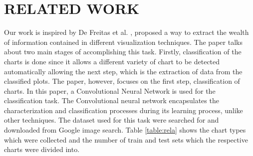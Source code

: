 \documentclass[12pt, a4paper,oneside]{report}
\begin{document}
\chapter{RELATED WORK}
Our work is inspired by De Freitas et al. \cite{junior2017architecture}, proposed a way to extract the wealth of information contained in different visualization techniques. The paper talks about two main stages of accomplishing this task. Firstly, classification of the charts is done since it allows a different variety of chart to be detected automatically allowing the next step, which is the extraction of data from the classified plots. The paper, however, focuses on the first step, classification of charts. In this paper, a Convolutional Neural Network is used for the classification task. The Convolutional neural network encapsulates the characterization and classification processes during its learning process, unlike other techniques. The dataset used for this task were searched for and downloaded from Google image search. Table \ref{table:rela} shows the chart types which were collected and the number of train and test sets which the respective charts were divided into.
\end{document}
